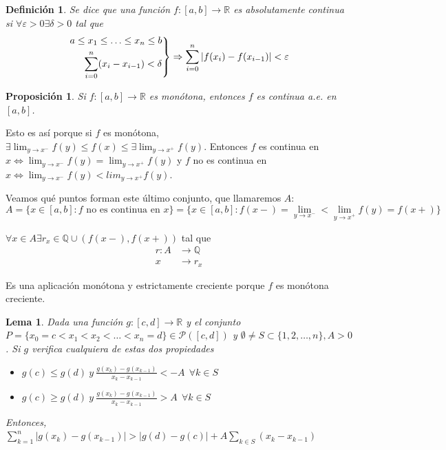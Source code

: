 \documentclass[11pt, a4paper]{article}
\makeatletter
\newif\IfInSansMode
\let\oldsf\sffamily
\renewcommand*{\sffamily}{\oldsf\mathversion{sans}\InSansModetrue}
\let\oldnorm\normalfont
\renewcommand*{\normalfont}{\oldnorm\InSansModefalse\mathversion{normal}}
\newcommand{\R}{\mathbb{R}} \newcommand{\N}{\mathbb{N}}
\renewenvironment{proof}[1][\proofname] {\par\pushQED{\qed}\normalfont\topsep6\p@\@plus6\p@\relax\trivlist\item[\hskip\labelsep\itshape\sffamily#1\@addpunct{.}]\ignorespaces}{\popQED\endtrivlist\@endpefalse}
\theoremstyle{theorem-style}
\newtheorem{nprop}{Proposición}[section]
\newtheorem{lema}{Lema}[section]
\theoremstyle{definition-style}
\newtheorem{ndef}{Definición}[section]
\theoremstyle{remark-style}
\theoremstyle{example-style}
\newenvironment{rcases}
{\left.\begin{aligned}}
    {\end{aligned}\right\rbrace}
\makeatother
\begin{document}
\begin{ndef}
    Se dice que una función $f : [a, b] \rightarrow \R$ es absolutamente continua si $\forall \varepsilon > 0 \exists \delta > 0$ tal que $$ \begin{rcases}
        a \leq x_1 \leq \hdots \leq x_n \leq b \\
        \sum^{n}_{i=0} (x_i - x_{i-1}) < \delta
    \end{rcases} \Rightarrow  \sum^{n}_{i=0} |f(x_i) - f(x_{i-1})| < \varepsilon$$ 
\end{ndef}

\begin{nprop}
    \label{elem-lebesgue-botsko-ob1}
     Si $f : [a, b] \rightarrow \R$ es monótona, entonces $f$ es continua \textit{a.e.} en $[a, b]$.
\end{nprop}

\begin{proof}
         Esto es así porque si $f$ es monótona, $\exists \lim_{y \to x^{-}} f(y) \leq f(x) \leq \exists \lim_{y \to x^{+}} f(y)$. Entonces $f$ es continua en $x \Leftrightarrow \lim_{y \to x^{-}} f(y) = \lim_{y \to x^{+}} f(y)$ y $f$ no es continua en $x \Leftrightarrow \lim_{y \to x^{-}} f(y) < lim_{y \to x^{+}} f(y)$.

   Veamos qué puntos forman este último conjunto, que llamaremos $A$: $$A = \{ x \in [a, b] : f \text{ no es continua en } x \} = \{x \in [a, b] : f(x-) = \lim_{y \to x^{-}} < \lim_{y \to x^{+}} f(y) = f(x+) \}$$

   $\forall x \in A \exists r_x \in \mathbb Q \cup (f(x-), f(x+))$  tal que \begin{align*}
       \label{}
       r: A &\longrightarrow \mathbb Q \\
        x & \longrightarrow r_x
   \end{align*}

   Es una aplicación monótona y estrictamente creciente porque $f$ es monótona creciente.

\end{proof}

\begin{lema}
    \label{elem-lebesgue-botsko-ej1}
    Dada una función $g : [c, d] \rightarrow \R$ y el conjunto $P = \{ x_0 = c < x_1 < x_2 < \hdots < x_n = d \} \in \mathcal P([c, d])$ y $\emptyset \neq S \subset \{ 1, 2, \hdots, n \}, A > 0$. Si $g$ verifica cualquiera de estas dos propiedades \begin{itemize}
        \item $\displaystyle g(c) \leq g(d) \ y \ \frac{g(x_k) - g(x_{k-1})}{x_k - x_{k-1}} < - A \ \ \forall k \in S$
        \item $ \displaystyle g(c) \geq g(d) \ y \ \frac{g(x_k) - g(x_{k-1})}{x_k - x_{k-1}} > A \ \ \forall k \in S$
    \end{itemize}
    Entonces, $ \displaystyle \sum^{n}_{k=1} |g(x_k) - g(x_{k-1})| > |g(d) - g(c)| + A \sum^{}_{k \in S} (x_k - x_{k-1})$ 

\end{lema}
\end{document}
